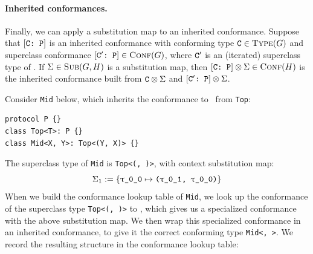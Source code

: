 \documentclass[../generics]{subfiles}
\begin{document}
\paragraph{Inherited conformances.}
Finally, we can apply a substitution map to an inherited conformance. Suppose that $[\texttt{C:~P}]$ is an inherited conformance with conforming type $\texttt{C} \in \textsc{Type}({G})$ and superclass conformance $[\texttt{$\texttt{C}'$:~P}] \in \textsc{Conf}({G})$, where $\texttt{C}'$ is an (iterated) superclass type of \tC. If $\Sigma \in \textsc{Sub}({G, H})$ is a substitution map, then  $[\texttt{C:~P}] \otimes \Sigma \in \textsc{Conf}({H})$ is the inherited conformance built from $\texttt{C} \otimes \Sigma$ and $[\texttt{$\texttt{C}'$:~P}] \otimes \Sigma$.

\begin{example}\label{inherited specialized conf}
Consider \texttt{Mid} below, which inherits the conformance to \tP\ from \texttt{Top}:
\begin{Verbatim}
protocol P {}
class Top<T>: P {}
class Mid<X, Y>: Top<(Y, X)> {}
\end{Verbatim}
The superclass type of \texttt{Mid} is \texttt{Top<(\rU, \rT)>}, with context substitution map:
\[\Sigma_1 := \SubstMap{\SubstType{\rT}{(\rU, \rT)}}\]
When we build the conformance lookup table of \texttt{Mid}, we look up the conformance of the superclass type \texttt{Top<(\rU, \rT)>} to \tP, which gives us a specialized conformance with the above substitution map. We then wrap this specialized conformance in an inherited conformance, to give it the correct conforming type \texttt{Mid<\rT, \rU>}. We record the resulting structure in the conformance lookup table:
\begin{center}
\end{center}
\end{example}
\end{document}
